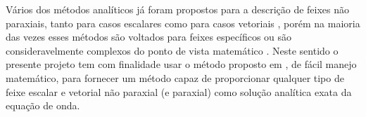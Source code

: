 Vários dos métodos analíticos já foram propostos para a descrição de feixes não paraxiais, tanto para casos escalares \cite{Lya:9}\cite{Lya:14}\cite{Lya:10} como para casos vetoriais \cite{Lya:5}\cite{Lya:15}\cite{Lya:13}\cite{Lya:25}\cite{Lya:22}\cite{Lya:1}\cite{Lya:7}\cite{Lya:37}, porém na maioria das vezes esses métodos são voltados para feixes específicos \cite{Lya:11}\cite{Lya:13}\cite{Lya:16}\cite{Lya:17}\cite{Lya:20} ou são consideravelmente complexos do ponto de vista matem\'atico \cite{Lya:11}. Neste sentido o presente projeto tem com finalidade usar o método proposto em \cite{Lya:2}, de fácil manejo matemático, para fornecer um método capaz de proporcionar qualquer tipo de feixe escalar e vetorial não paraxial (e paraxial) como solução analítica exata da equação de onda.
